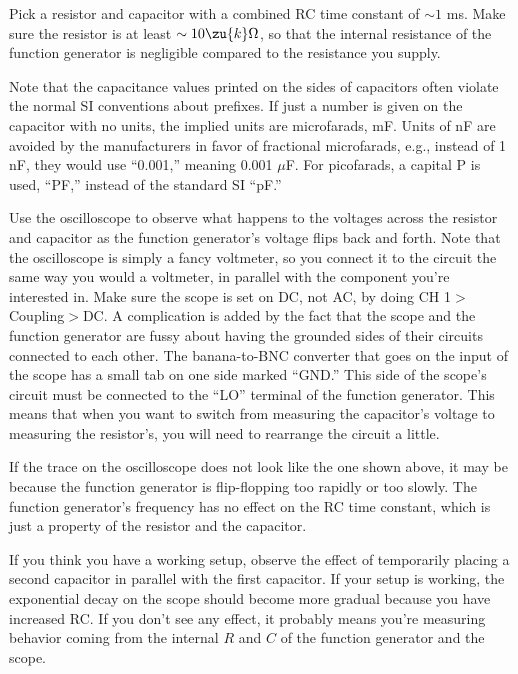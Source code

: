 
Pick a resistor and capacitor with a combined RC time
constant of $\sim1$ ms. Make sure the resistor is at least
$\sim10\zu{k}\Omega $, so that the internal resistance of the
function generator is negligible compared to the resistance you supply.

Note that the capacitance values printed on the sides of
capacitors often violate the normal SI conventions about
prefixes. If just a number is given on the capacitor with no
units, the implied units are microfarads, mF. Units of nF
are avoided by the manufacturers in favor of fractional
microfarads, e.g., instead of 1 nF, they would use ``0.001,''
meaning 0.001 $\mu $F. For picofarads, a capital P is
used, ``PF,'' instead of the standard SI ``pF.''

 Use the oscilloscope to observe what happens to the
voltages across the resistor and capacitor as the function
generator's voltage flips back and forth. Note that the
oscilloscope is simply a fancy voltmeter, so you connect it
to the circuit the same way you would a voltmeter, in
parallel with the component you're interested in. Make sure the
scope is set on DC, not AC, by doing CH 1$>$Coupling$>$DC. A
complication is added by the fact that the scope and the
function generator are fussy about having the grounded sides
of their circuits connected to each other. The banana-to-BNC
converter that goes on the input of the scope has a small
tab on one side marked ``GND.'' This side of the scope's
circuit must be connected to the ``LO'' terminal of the
function generator. This means that when you want to switch
from measuring the capacitor's voltage to measuring the
resistor's, you will need to rearrange the circuit a little.

If the trace on the oscilloscope does not look like the one
shown above, it may be because the function generator is
flip-flopping too rapidly or too slowly. The function
generator's frequency has no effect on the RC time constant,
which is just a property of the resistor and the capacitor. 

If you think you have a working setup, observe the effect of
temporarily placing a second capacitor in parallel with the
first capacitor. If your setup is working, the exponential
decay on the scope should become more gradual because you
have increased RC. If you don't see any effect, it probably
means you're measuring behavior coming from the internal $R$
and $C$ of the function generator and the scope.

